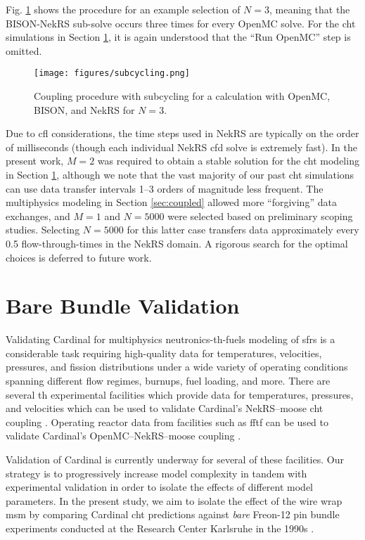 \documentclass[3p,,preprint,11pt]{elsarticle}
\begin{document}
Fig. \ref{fig:subcycling} shows the procedure for an example selection of $N=3$, meaning that the BISON-NekRS sub-solve occurs three times for every OpenMC solve. For the \gls{cht} simulations in Section \ref{sec:cheng}, it is again understood that the ``Run OpenMC'' step is omitted.

\begin{figure}[!htb]
\centering
\texttt{[image: figures/subcycling.png]}
\caption{\centering Coupling procedure with subcycling for a calculation with OpenMC, BISON, and NekRS for $N=3$.}
\label{fig:subcycling}
\end{figure}

Due to \gls{cfl} considerations, the time steps used in NekRS are typically on the order of milliseconds (though each individual NekRS \gls{cfd} solve is extremely fast).
In the present work, $M=2$ was required to obtain a stable solution for the \gls{cht} modeling in Section \ref{sec:cheng}, although we note that the vast majority of our past \gls{cht} simulations can use data transfer intervals 1--3 orders of magnitude less frequent. The multiphysics modeling in Section \ref{sec:coupled} allowed more ``forgiving'' data exchanges, and $M=1$ and $N=5000$ were selected based on preliminary scoping studies. Selecting $N=5000$ for this latter case transfers data approximately every 0.5 flow-through-times in the NekRS domain. A rigorous search for the optimal choices is deferred to future work.

\section{Bare Bundle Validation}
\label{sec:cheng}

Validating Cardinal for multiphysics neutronics-\gls{th}-fuels modeling of \glspl{sfr} is a considerable task requiring high-quality data for temperatures, velocities, pressures, and fission distributions under a wide variety of operating conditions spanning different flow regimes, burnups, fuel loading, and more. There are several \gls{th} experimental facilities which provide data for temperatures, pressures, and velocities which can be used to validate Cardinal's NekRS--\gls{moose} \gls{cht} coupling \cite{chang_2017,choi,goth,song_2020,chun,rehme,roidt,engel,engel1980,fontana,mays,krishna}. Operating reactor data from facilities such as \gls{fftf} can be used to validate Cardinal's OpenMC--NekRS--\gls{moose} coupling \cite{fftf}. 

Validation of Cardinal is currently underway for several of these facilities. Our strategy is to progressively increase model complexity in tandem with experimental validation in order to isolate the effects of different model parameters. In the present study, we aim to isolate the effect of the wire wrap \gls{msm} by comparing Cardinal \gls{cht} predictions against {\it bare} Freon-12 pin bundle experiments conducted at the Research Center Karlsruhe in the 1990s \cite{cheng1998, cheng2009}. 
\end{document}
